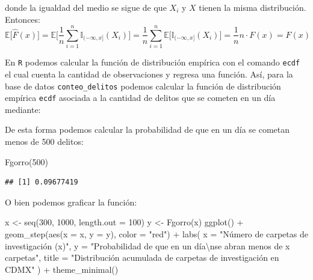 \documentclass[
]{book}
\newenvironment{Shaded}{\begin{snugshade}}{\end{snugshade}}
\newcommand{\AttributeTok}[1]{\textcolor[rgb]{0.77,0.63,0.00}{#1}}
\newcommand{\DecValTok}[1]{\textcolor[rgb]{0.00,0.00,0.81}{#1}}
\newcommand{\FunctionTok}[1]{\textcolor[rgb]{0.00,0.00,0.00}{#1}}
\newcommand{\NormalTok}[1]{#1}
\newcommand{\OtherTok}[1]{\textcolor[rgb]{0.56,0.35,0.01}{#1}}
\newcommand{\SpecialCharTok}[1]{\textcolor[rgb]{0.00,0.00,0.00}{#1}}
\newcommand{\StringTok}[1]{\textcolor[rgb]{0.31,0.60,0.02}{#1}}
\begin{document}
donde la igualdad del medio se sigue de que \(X_i\) y \(X\) tienen la misma distribución. Entonces:
\[
\mathbb{E}\big[ \hat{F}(x) \big] = \mathbb{E}\Big[ \dfrac{1}{n} \sum\limits_{i=1}^{n} \mathbb{I}_{(-\infty, x]}(X_i) \Big] = \dfrac{1}{n}\sum\limits_{i=1}^{n} \mathbb{E}\big[  \mathbb{I}_{(-\infty, x]}(X_i)\big] = \dfrac{1}{n} n \cdot F(x) = F(x)
\]

En \texttt{R} podemos calcular la función de distribución empírica con el comando \texttt{ecdf} el cual cuenta la cantidad de observaciones y regresa una función. Así, para la base de datos \texttt{conteo\_delitos} podemos calcular la función de distribución empírica \texttt{ecdf} asociada a la cantidad de delitos que se cometen en un día mediante:

\begin{Shaded}
\end{Shaded}

De esta forma podemos calcular la probabilidad de que en un día se cometan menos de 500 delitos:

\begin{Shaded}
\begin{Highlighting}[]
\FunctionTok{Fgorro}\NormalTok{(}\DecValTok{500}\NormalTok{)}
\end{Highlighting}
\end{Shaded}

\begin{verbatim}
## [1] 0.09677419
\end{verbatim}

O bien podemos graficar la función:

\begin{Shaded}
\begin{Highlighting}[]
\NormalTok{x }\OtherTok{\textless{}{-}} \FunctionTok{seq}\NormalTok{(}\DecValTok{300}\NormalTok{, }\DecValTok{1000}\NormalTok{, }\AttributeTok{length.out =} \DecValTok{100}\NormalTok{)}
\NormalTok{y }\OtherTok{\textless{}{-}} \FunctionTok{Fgorro}\NormalTok{(x)}
\FunctionTok{ggplot}\NormalTok{() }\SpecialCharTok{+}
  \FunctionTok{geom\_step}\NormalTok{(}\FunctionTok{aes}\NormalTok{(}\AttributeTok{x =}\NormalTok{ x, }\AttributeTok{y =}\NormalTok{ y), }\AttributeTok{color =} \StringTok{"red"}\NormalTok{) }\SpecialCharTok{+}
  \FunctionTok{labs}\NormalTok{(}
    \AttributeTok{x =} \StringTok{"Número de carpetas de investigación (x)"}\NormalTok{,}
    \AttributeTok{y =} \StringTok{"Probabilidad de que en un día}\SpecialCharTok{\textbackslash{}n}\StringTok{se abran menos de x carpetas"}\NormalTok{,}
    \AttributeTok{title =} \StringTok{"Distribución acumulada de carpetas de investigación en CDMX"}
\NormalTok{  ) }\SpecialCharTok{+}
  \FunctionTok{theme\_minimal}\NormalTok{()}
\end{Highlighting}
\end{Shaded}
\end{document}
